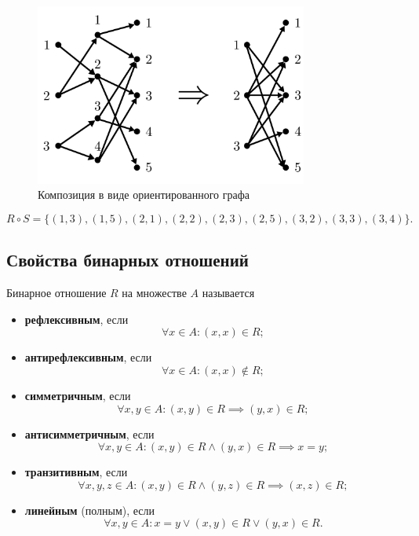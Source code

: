 \documentclass[a5paper, 11pt]{extarticle}
\theoremstyle{definition}
\theoremstyle{definition}
\theoremstyle{definition}
\numberwithin{figure}{section}
\numberwithin{table}{section}
\begin{document}
\begin{figure}[H]
    \centering
    \includegraphics[width=0.8\textwidth]{images/composition-graph.png}
    \caption{Композиция в виде ориентированного графа}
\end{figure}

\[
    R \circ S = \{(1, 3), (1, 5), (2, 1), (2, 2), (2, 3), (2, 5), (3, 2), (3, 3), (3, 4)\}.
\]

\subsection{Свойства бинарных отношений}

Бинарное отношение \(R\) на множестве \(A\) называется
\begin{itemize}
    \item \textbf{рефлексивным}, если
          \[
              \forall x \in A : (x, x) \in R;
          \]
    \item \textbf{антирефлексивным}, если
          \[
              \forall x \in A : (x, x) \notin R;
          \]
    \item \textbf{симметричным}, если
          \[
              \forall x, y \in A : (x, y) \in R \implies (y, x) \in R ;
          \]
    \item \textbf{антисимметричным}, если
          \[
              \forall x, y \in A : (x, y) \in R \land (y, x) \in R \implies x = y;
          \]
    \item \textbf{транзитивным}, если
          \[
              \forall x, y, z \in A : (x, y) \in R \land (y, z) \in R \implies (x, z) \in R;
          \]
    \item \textbf{линейным} (полным), если
          \[
              \forall x, y \in A : x = y \lor (x, y) \in R \lor (y, x) \in R.
          \]
\end{itemize}
\end{document}
